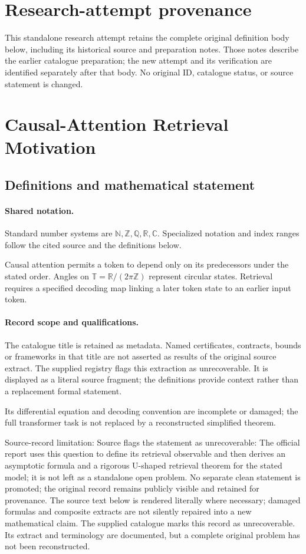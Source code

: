 \documentclass[11pt]{article}
\begin{document}
\section*{Research-attempt provenance}
This standalone research attempt retains the complete original definition body below,
including its historical source and preparation notes. Those notes describe the
earlier catalogue preparation; the new attempt and its verification are identified
separately after that body. No original ID, catalogue status, or source statement is changed.

\section{Causal-Attention Retrieval Motivation}\label{statement}

\subsection{Definitions and mathematical statement}

\paragraph{Shared notation.}Standard number systems are $\mathbb N,\mathbb Z,\mathbb Q,\mathbb R,\mathbb C$. Specialized notation and index ranges follow the cited source and the definitions below.


Causal attention permits a token to depend only on its predecessors under the stated order. Angles on $\mathbb T=\mathbb R/(2\pi\mathbb Z)$ represent circular states. Retrieval requires a specified decoding map linking a later token state to an earlier input token.
\paragraph{Record scope and qualifications.}
The catalogue title is retained as metadata. Named certificates, contracts, bounds or frameworks in that title are not asserted as results of the original source extract.
The supplied registry flags this extraction as unrecoverable. It is displayed as a literal source fragment; the definitions provide context rather than a replacement formal statement.

Its differential equation and decoding convention are incomplete or damaged; the full transformer task is not replaced by a reconstructed simplified theorem.

Source-record limitation: Source flags the statement as unrecoverable: The official report uses this question to define its retrieval observable and then derives an asymptotic formula and a rigorous U-shaped retrieval theorem for the stated model; it is not left as a standalone open problem. No separate clean statement is promoted; the original record remains publicly visible and retained for provenance.
The source text below is rendered literally where necessary; damaged formulas and composite extracts are not silently repaired into a new mathematical claim.
The supplied catalogue marks this record as unrecoverable. Its extract and terminology are documented, but a complete original problem has not been reconstructed.
\end{document}
